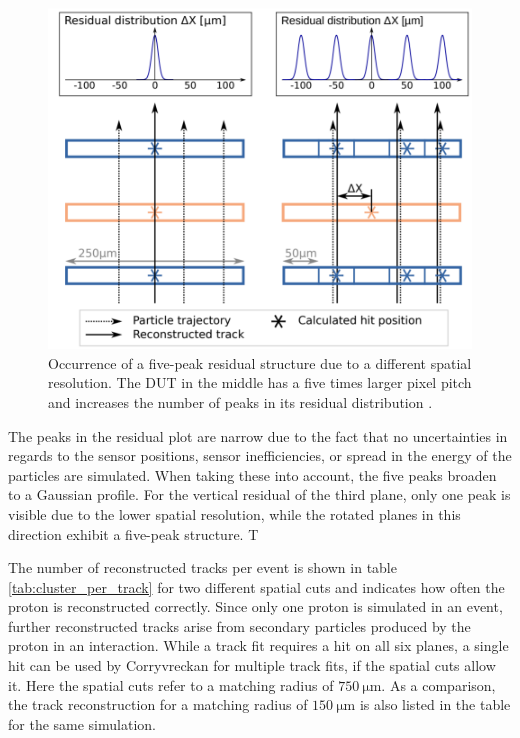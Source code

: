 \begin{figure}
  \centering
  \includegraphics[height=0.6\textwidth]{images/peaks.png}
  \caption{Occurrence of a five-peak residual structure due to a different spatial resolution. The DUT in the middle
  has a five times larger pixel pitch and increases the number of peaks in its residual distribution \cite{peaks}.}
  \label{fig:peaks}
\end{figure}

The peaks in the residual plot are narrow due to the fact that no uncertainties in regards
to the sensor positions, sensor inefficiencies, or spread in the energy of the particles are simulated. When taking these into account, the
five peaks broaden to a Gaussian profile.
For the vertical residual of the third plane, only one peak is visible due to the lower spatial resolution, while the rotated planes
in this direction exhibit a five-peak structure. T

The number of reconstructed tracks per event is shown in table \ref{tab:cluster_per_track} for two different spatial cuts and indicates how often the proton is
reconstructed correctly. Since only one proton is simulated in an event, further reconstructed tracks arise from secondary
particles produced by the proton in an interaction. While a track fit requires a hit on all six planes, a single hit can be used by
Corryvreckan for multiple track fits, if the spatial cuts allow it. Here the spatial cuts refer to a matching radius of $\SI{750}{\micro\meter}$.
As a comparison, the track reconstruction for a matching radius of $\SI{150}{\micro\meter}$ is also listed in the table for the same
simulation.

